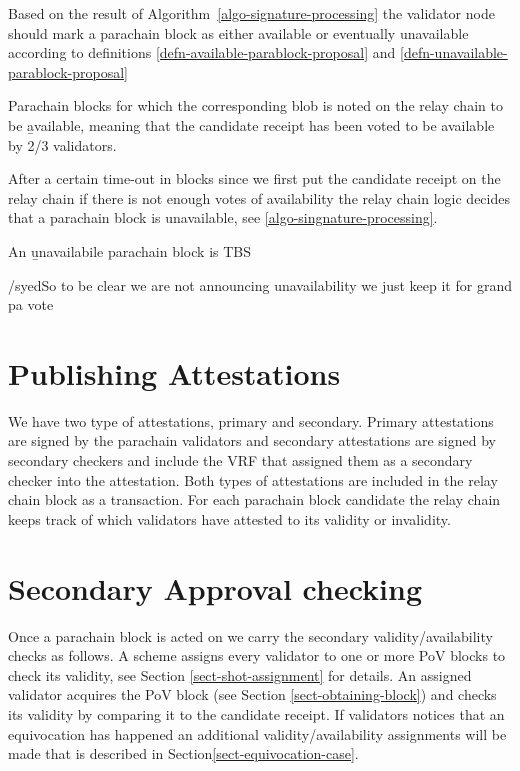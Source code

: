 Based on the result of Algorithm~\ref{algo-signature-processing} the validator node should mark a parachain block as either available or eventually unavailable according to definitions \ref{defn-available-parablock-proposal} and \ref{defn-unavailable-parablock-proposal}
\begin{definition}
  \label{defn-available-parablock-proposal}
        Parachain blocks for which the corresponding blob is  noted on the relay chain to be {\b available}, meaning that the candidate receipt has been voted to be available by 2/3 validators.
\end{definition}

After a certain time-out in blocks since we first put the candidate receipt on the relay chain if there is not enough votes of availability the relay chain logic decides that a parachain block is unavailable, see \ref{algo-singnature-processing}.

\begin{definition}
  \label{defn-unavailable-parachain-block}
       An {\b unavailabile parachain block} is TBS
\end{definition}

/syed{}{So to be clear we are not announcing unavailability we just keep it for grand pa vote}

\section{Publishing Attestations}
\label{sect-publishing-attestations}
We have two type of attestations, primary and secondary. Primary attestations are signed by the parachain validators and secondary attestations are signed by secondary checkers and include the VRF that assigned them as a secondary checker into the attestation. Both types of attestations are included in the relay chain block as a transaction. For each parachain block candidate the relay chain keeps track of which validators have attested to its validity or invalidity.

\section{Secondary Approval checking}
\label{sect-approval-checking}
Once a parachain block is acted on we carry the secondary validity/availability checks as follows. A scheme assigns every validator to one or more PoV blocks to check its validity, see Section \ref{sect-shot-assignment} for details. An assigned validator acquires the PoV block (see Section \ref{sect-obtaining-block}) and checks its validity by comparing it to the candidate receipt. If validators notices that an equivocation has happened an additional validity/availability assignments will be made that is described in Section\ref{sect-equivocation-case}.


